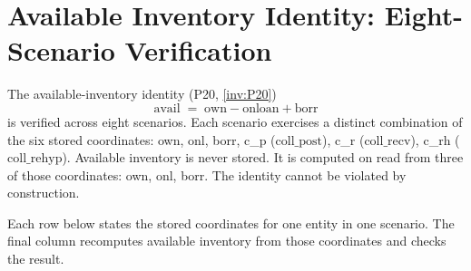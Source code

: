\section{Available Inventory Identity: Eight-Scenario Verification}
\label{app:avail-identity}

The available-inventory identity (P20, \ref{inv:P20})
\[
  \mathrm{avail} \;=\; \mathrm{own} - \mathrm{onloan} + \mathrm{borr}
\]
is verified across eight scenarios. Each scenario exercises a distinct combination of the six stored coordinates: own, onl, borr, c\_p ($\mathrm{coll\_post}$), c\_r ($\mathrm{coll\_recv}$), c\_rh ($\mathrm{coll\_rehyp}$). Available inventory is never stored. It is computed on read from three of those coordinates: own, onl, borr. The identity cannot be violated by construction.

Each row below states the stored coordinates for one entity in one scenario. The final column recomputes available inventory from those coordinates and checks the result.

